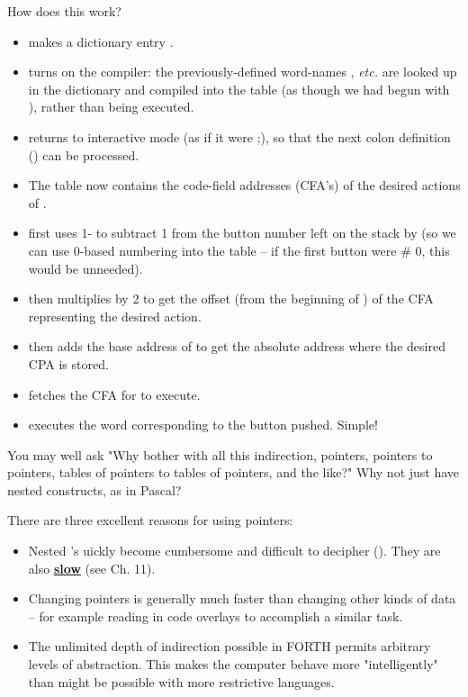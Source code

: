 How does this work?
\begin{itemize}
    \item {} makes a dictionary entry .
    \item \bc{]} turns on the compiler: the previously-defined word-names , \textit{etc.} are looked up in the dictionary and compiled into the table (as though we had begun with \bc{:}), rather than being executed.
    \item \bc{[} returns to interactive mode (as if it were ;), so that the next colon definition () can be processed.
    \item The table  now contains the code-field addresses (CFA’s) of the desired actions of .
    \item {} first uses 1- to subtract 1 from the button number left on the stack by  (so we can use 0-based numbering into the table -- if the first button were \# 0, this would be unneeded).
    \item {} then multiplies by 2 to get the offset (from the beginning of ) of the CFA representing the desired action.
    \item {} then adds the base address of  to get the absolute address where the desired CPA is stored.
    \item {} fetches the CFA for  to execute.
    \item {} executes the word corresponding to the button pushed. Simple!
\end{itemize}

You may well ask "Why bother with all this indirection, pointers, pointers to pointers, tables of pointers to tables of pointers, and the like?" Why not just have nested  constructs, as in Pascal?

There are three excellent reasons for using pointers:
\begin{itemize}
    \item Nested 's uickly become cumbersome and difficult to decipher (\TF). They are also \underline{\textbf{slow}} (see Ch. 11).
    \item Changing pointers is generally much faster than changing other kinds of data -- for example reading in code overlays to accomplish a similar task.
    \item The unlimited depth of indirection possible in FORTH permits arbitrary levels of abstraction. This makes the computer behave more "intelligently" than might be possible with more restrictive languages.
\end{itemize}

